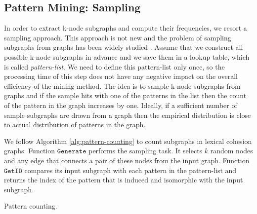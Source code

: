 \subsection{Pattern Mining: Sampling}
In order to extract k-node subgraphs and compute their frequencies, we resort a sampling approach. 
This approach is not new and the problem of sampling subgraphs from graphs has been widely studied \cite{weissman03,shervashidze09}. 
Assume that we construct all possible k-node subgraphs in advance and we save them in a lookup table, which is called \emph{pattern-list}.  
We need to define this pattern-list only once, so the processing time of this step does not have any negative impact on the overall efficiency of the mining method.  
The idea is to sample k-node subgraphs from graphs and if the sample hits with one of the patterns in the list then the count of the pattern in the graph increases by one. 
Ideally, if a sufficient number of sample subgraphs are drawn from a graph then the empirical distribution is close to actual distribution of patterns in the graph. 

We follow Algorithm \ref{alg:pattern-counting} to count subgraphs in lexical cohesion graphs.  
Function $\mathtt{Generate}$ performs the sampling task.  
It selects $k$ random nodes and any edge that connects a pair of these nodes from the input graph. 
Function $\mathtt{GetID}$ compares its input subgraph with each pattern in the pattern-list and returns the index of the pattern that is induced and isomorphic with the input subgraph.  

\begin{algorithm}
    \begin{algorithmic}[1]
                \EndWhile
            \EndWhile
        \EndFunction
    \end{algorithmic}
    \caption{Pattern counting.}
    \label{alg:pattern-counting}
\end{algorithm}

